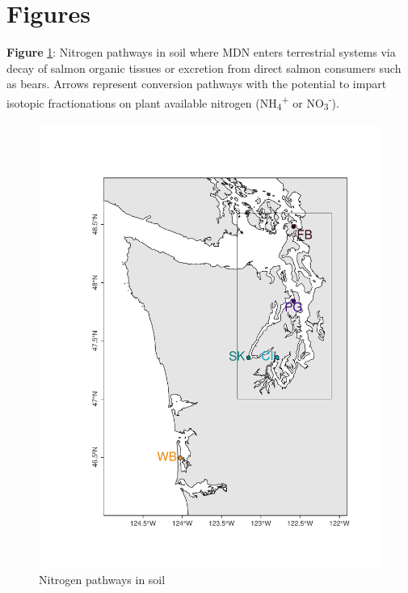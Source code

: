 \documentclass [11pt, proquest] {uwthesis}[2015/03/03]
\begin{document}
\hypertarget{figures}{%
\section{Figures}\label{figures}}

\textbf{Figure} \ref{fig:npathways}: Nitrogen pathways in soil where MDN enters terrestrial systems via decay of salmon organic tissues or excretion from direct salmon consumers such as bears. Arrows represent conversion pathways with the potential to impart isotopic fractionations on plant available nitrogen (NH\textsubscript{4}\textsuperscript{+} or NO\textsubscript{3}\textsuperscript{-}).\newline
\begin{figure}[h]
  \includegraphics{figure/Ch1/fig1.1.pdf}
  \caption{Nitrogen pathways in soil}
  \label{fig:npathways}
\end{figure}
\clearpage
\end{document}
